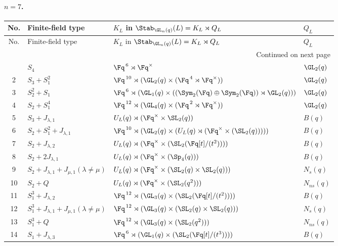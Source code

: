 \paragraph{$n=7$.}
\begin{longtable}{@{}c p{} p{} p{}@{}}
\toprule
No. & Finite-field type & $K_L$ in $\Stab_{\GL_n(q)}(L)=K_L\rtimes Q_L$ & $Q_L$ \\
\midrule
\endfirsthead
\toprule
No. & Finite-field type & $K_L$ in $\Stab_{\GL_n(q)}(L)=K_L\rtimes Q_L$ & $Q_L$ \\
\midrule
\endhead
\midrule
\multicolumn{4}{r}{Continued on next page}\\
\midrule
\endfoot
\bottomrule
\endlastfoot
1 & $S_4$ & $\Fq^{\,6}\rtimes \Fq^\times$ & $\GL_2(q)$ \\
2 & $S_3 + S_1^2$ & $\Fq^{\,10}\rtimes (\GL_2(q)\times (\Fq^{\,4}\rtimes \Fq^\times))$ & $\GL_2(q)$ \\
3 & $S_2^2 + S_1$ & $\Fq^{\,6}\rtimes (\GL_1(q)\times ((\Sym_2(\Fq)\oplus \Sym_2(\Fq))\rtimes \GL_2(q)))$ & $\GL_2(q)$ \\
4 & $S_2 + S_1^4$ & $\Fq^{\,12}\rtimes (\GL_4(q)\times (\Fq^{\,2}\rtimes \Fq^\times))$ & $\GL_2(q)$ \\
5 & $S_3 + J_{\lambda,1}$ & $U_L(q)\rtimes (\Fq^\times\times \SL_2(q))$ & $B(q)$ \\
6 & $S_2 + S_1^2 + J_{\lambda,1}$ & $\Fq^{\,10}\rtimes (\GL_2(q)\times (U_L(q)\rtimes (\Fq^\times\times (\SL_2(q)))))$ & $B(q)$ \\
7 & $S_2 + J_{\lambda,2}$ & $U_L(q)\rtimes (\Fq^\times\times (\SL_2(\Fq[t]/(t^2))))$ & $B(q)$ \\
8 & $S_2 + 2J_{\lambda,1}$ & $U_L(q)\rtimes (\Fq^\times\times (\Sp_4(q)))$ & $B(q)$ \\
9 & $S_2 + J_{\lambda,1} + J_{\mu,1} (\lambda \neq \mu)$ & $U_L(q)\rtimes (\Fq^\times\times (\SL_2(q)\times \SL_2(q)))$ & $N_s(q)$ \\
10 & $S_2 + Q$ & $U_L(q)\rtimes (\Fq^\times\times (\SL_2(q^2)))$ & $N_{ns}(q)$ \\
11 & $S_1^3 + J_{\lambda,2}$ & $\Fq^{\,12}\rtimes (\GL_3(q)\times (\SL_2(\Fq[t]/(t^2))))$ & $B(q)$ \\
12 & $S_1^3 + J_{\lambda,1} + J_{\mu,1} (\lambda \neq \mu)$ & $\Fq^{\,12}\rtimes (\GL_3(q)\times (\SL_2(q)\times \SL_2(q)))$ & $N_s(q)$ \\
13 & $S_1^3 + Q$ & $\Fq^{\,12}\rtimes (\GL_3(q)\times (\SL_2(q^2)))$ & $N_{ns}(q)$ \\
14 & $S_1 + J_{\lambda,3}$ & $\Fq^{\,6}\rtimes (\GL_1(q)\times (\SL_2(\Fq[t]/(t^3))))$ & $B(q)$ \\

\end{longtable}
